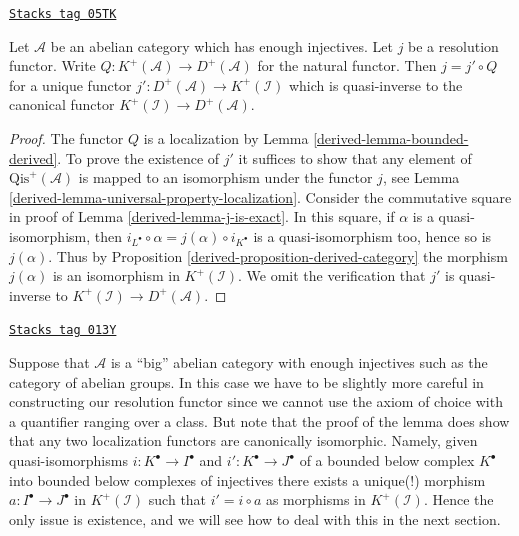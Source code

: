 \begin{lemma}
\label{derived-lemma-resolution-functor-quasi-inverse}
\href{https://stacks.math.columbia.edu/tag/05TK}{\texttt{Stacks tag 05TK}}

Let $\mathcal{A}$ be an abelian category which has enough injectives.
Let $j$ be a resolution functor. Write
$Q : K^{+}(\mathcal{A}) \to D^{+}(\mathcal{A})$ for the natural functor.
Then $j = j' \circ Q$ for a unique
functor $j' : D^{+}(\mathcal{A}) \to K^{+}(\mathcal{I})$ which
is quasi-inverse to the canonical functor
$K^{+}(\mathcal{I}) \to D^{+}(\mathcal{A})$.
\end{lemma}

\begin{proof}

The functor $Q$ is a localization by
Lemma \ref{derived-lemma-bounded-derived}.
To prove the existence of $j'$ it suffices to show that any element of
$\text{Qis}^{+}(\mathcal{A})$ is mapped to an isomorphism under
the functor $j$, see Lemma \ref{derived-lemma-universal-property-localization}.
Consider the commutative square in proof of
Lemma \ref{derived-lemma-j-is-exact}. In this square, if $\alpha$ is a
quasi-isomorphism, then $i_{L^\bullet}\circ\alpha=j(\alpha)\circ i_{K^\bullet}$
is a quasi-isomorphism too, hence so is $j(\alpha)$. Thus by
Proposition \ref{derived-proposition-derived-category} the morphism
$j(\alpha)$ is an isomorphism in $K^+(\mathcal{I})$. We omit the
verification that $j'$ is quasi-inverse to
$K^{+}(\mathcal{I}) \to D^{+}(\mathcal{A})$.
\end{proof}

\begin{remark}
\label{derived-remark-big-localization}
\href{https://stacks.math.columbia.edu/tag/013Y}{\texttt{Stacks tag 013Y}}

Suppose that $\mathcal{A}$ is a ``big'' abelian category with enough injectives
such as the category of abelian groups. In this case we have to be slightly
more careful in constructing our resolution functor since we cannot use
the axiom of choice with a quantifier ranging over a class. But note that
the proof of the lemma does show that any two localization functors are
canonically isomorphic. Namely, given quasi-isomorphisms
$i : K^\bullet \to I^\bullet$ and $i' : K^\bullet \to J^\bullet$ of
a bounded below complex $K^\bullet$ into bounded below complexes of injectives
there exists a unique(!) morphism $a : I^\bullet \to J^\bullet$
in $K^{+}(\mathcal{I})$ such that $i' = i \circ a$ as morphisms in
$K^{+}(\mathcal{I})$. Hence the only issue is existence, and we will see how
to deal with this in the next section.
\end{remark}

